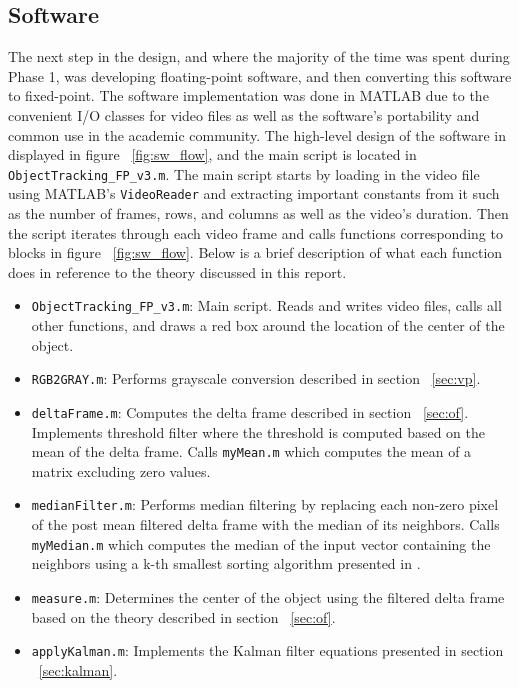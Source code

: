 \documentclass[12pt]{article} %
\begin{document}
\subsection{Software}
\label{sec:software}
The next step in the design, and where the majority of the time was spent during Phase 1, was developing floating-point software, and then converting this software to fixed-point. The software implementation was done in MATLAB due to the convenient I/O classes for video files as well as the software's portability and common use in the academic community. The high-level design of the software in displayed in figure ~\ref{fig:sw_flow}, and the main script is located in \texttt{ObjectTracking\_FP\_v3.m}. The main script starts by loading in the video file using MATLAB's \texttt{VideoReader} and extracting important constants from it such as the number of frames, rows, and columns as well as the video's duration. Then the script iterates through each video frame and calls functions corresponding to blocks in figure ~\ref{fig:sw_flow}. Below is a brief description of what each function does in reference to the theory discussed in this report.
\begin{itemize}
\item[] \texttt{ObjectTracking\_FP\_v3.m}: Main script. Reads and writes video files, calls all other functions, and draws a red box around the location of the center of the object.
\item[] \texttt{RGB2GRAY.m}: Performs grayscale conversion described in section ~\ref{sec:vp}.
\item[] \texttt{deltaFrame.m}: Computes the delta frame described in section ~\ref{sec:of}. Implements threshold filter where the threshold is computed based on the mean of the delta frame. Calls \texttt{myMean.m} which computes the mean of a matrix excluding zero values.
\item[] \texttt{medianFilter.m}: Performs median filtering by replacing each non-zero pixel of the post mean filtered delta frame with the median of its neighbors. Calls \texttt{myMedian.m} which computes the median of the input vector containing the neighbors using a k-th smallest sorting algorithm presented in \cite{11}.
\item[] \texttt{measure.m}: Determines the center of the object using the filtered delta frame based on the theory described in section ~\ref{sec:of}.
\item[] \texttt{applyKalman.m}: Implements the Kalman filter equations presented in section ~\ref{sec:kalman}.
\end{itemize}
\end{document}
